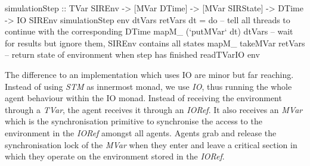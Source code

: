 \begin{HaskellCode}
simulationStep :: TVar SIREnv
               -> [MVar DTime]
               -> [MVar SIRState]
               -> DTime
               -> IO SIREnv
simulationStep env dtVars retVars dt = do
  -- tell all threads to continue with the corresponding DTime
  mapM_ (`putMVar` dt) dtVars
  -- wait for results but ignore them, SIREnv contains all states
  mapM_ takeMVar retVars
  -- return state of environment when step has finished
  readTVarIO env
\end{HaskellCode}

The difference to an implementation which uses IO are minor but far reaching. Instead of using \textit{STM} as innermost monad, we use \textit{IO}, thus running the whole agent behaviour within the IO monad. Instead of receiving the environment through a \textit{TVar}, the agent receives it through an \textit{IORef}. It also receives an \textit{MVar} which is the synchronisation primitive to synchronise the access to the environment in the \textit{IORef} amongst all agents. Agents grab and release the synchronisation lock of the \textit{MVar} when they enter and leave a critical section in which they operate on the environment stored in the \textit{IORef}.